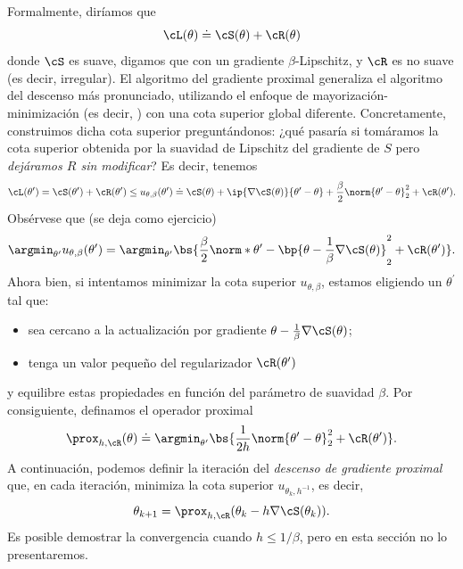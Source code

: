 \documentclass[../../book-main_es.tex]{subfiles}
\begin{document}
Formalmente, diríamos que
\begin{equation}
    \cL(\theta) \doteq \cS(\theta) + \cR(\theta)
\end{equation}
donde \(\cS\) es suave, digamos que con un gradiente \(\beta\)-Lipschitz, y
\(\cR\) es no suave (es decir, irregular). El algoritmo del gradiente proximal
generaliza el algoritmo del descenso más pronunciado, utilizando el
enfoque de mayorización-minimización (es decir,
) con una cota superior global diferente.
Concretamente, construimos dicha cota superior preguntándonos: ¿qué pasaría si
tomáramos la cota superior obtenida por la suavidad de Lipschitz del gradiente de \(S\) pero \textit{dejáramos
\(R\) sin modificar}?  Es decir, tenemos
\begin{equation}
    \cL(\theta^{\prime}) = \cS(\theta^{\prime}) +
    \cR(\theta^{\prime}) \leq u_{\theta, \beta}(\theta^{\prime})
    \doteq \cS(\theta) + \ip{\nabla \cS(\theta)}{\theta^{\prime} -
    \theta} + \frac{\beta}{2}\norm{\theta^{\prime} - \theta}_{2}^{2}
    + \cR(\theta^{\prime}).
\end{equation}
Obsérvese que (se deja como ejercicio)
\begin{equation}
    \argmin_{\theta^{\prime}}u_{\theta, \beta}(\theta^{\prime}) =
    \argmin_{\theta^{\prime}}\bs{\frac{\beta}{2}\norm*{\theta^{\prime}
        - \bp{\theta - \frac{1}{\beta}\nabla \cS(\theta)}}_{2}^{2} +
    \cR(\theta^{\prime})}.
\end{equation}
Ahora bien, si intentamos minimizar la cota superior \(u_{\theta, \beta}\),
estamos eligiendo un \(\theta^{\prime}\) tal que:
\begin{itemize}
    \item sea cercano a la actualización por gradiente \(\theta -
        \frac{1}{\beta}\nabla \cS(\theta)\);
    \item tenga un valor pequeño del regularizador \(\cR(\theta^{\prime})\)
\end{itemize}
y equilibre estas propiedades en función del parámetro de suavidad
\(\beta\). Por consiguiente, definamos el operador proximal
\begin{equation}
    \prox_{h, \cR}(\theta) \doteq
    \argmin_{\theta^{\prime}}\bs{\frac{1}{2h}\norm{\theta^{\prime} -
    \theta}_{2}^{2} + \cR(\theta^{\prime})}.
\end{equation}
A continuación, podemos definir la iteración del \textit{descenso de gradiente proximal}
que, en cada iteración, minimiza la cota superior \(u_{\theta_{k},
h^{-1}}\), es decir,
\begin{equation}
    \theta_{k + 1} = \prox_{h, \cR}(\theta_{k} - h\nabla \cS(\theta_{k})).
\end{equation}
Es posible demostrar la convergencia cuando \(h \leq 1/\beta\), pero
en esta sección no lo presentaremos.
\end{document}
